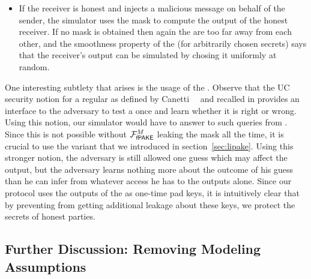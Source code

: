 \begin{itemize}
\begin{itemize}
  \item If the receiver is honest and \Env injects a malicious message on behalf of the sender, the simulator uses the mask to compute the output of the honest receiver. If no mask is obtained then again the \passwords are too far away from each other, and the smoothness property of the \RSS (for arbitrarily chosen secrets) says that the receiver's output can be simulated by chosing it uniformly at random. 
  \end{itemize}
\end{itemize}
One interesting subtlety that arises is the usage of the \iPAKE. Observe that the UC security notion for a regular \PAKE as defined by Canetti~\etal~\cite{EC:CHKLM05} and recalled in  provides an interface to the adversary to test a \password once and learn whether it is right or wrong. Using this notion, our simulator would have to answer to such queries from \Env. Since this is not possible without $\mathcal{F}_\textsf{fPAKE}^M$ leaking the mask all the time, it is crucial to use the \iPAKE variant that we introduced in section~\ref{sec:lipake}.
Using this stronger notion, the adversary is still allowed one \password guess which may affect the output, but the adversary learns nothing more about the outcome of his guess than he can infer from whatever access he has to the outputs alone. Since our protocol uses the outputs of the \PAKE as one-time pad keys, it is intuitively clear that by preventing \Env from getting additional leakage about these keys, we protect the secrets of honest parties.


\subsection{Further Discussion: Removing Modeling Assumptions}

